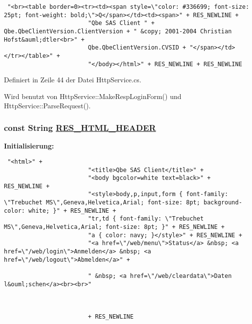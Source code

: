 \footnotesize\begin{verbatim} "<br><table border=0><tr><td><span style=\"color: #336699; font-size: 25pt; font-weight: bold;\">Q</span></td><td><span>" + RES_NEWLINE + 
                        "Qbe SAS Client " + Qbe.QbeClientVersion.ClientVersion + " &copy; 2001-2004 Christian Hofst&auml;dtler<br>" + 
                        Qbe.QbeClientVersion.CVSID + "</span></td></tr></table>" + 
                        "</body></html>" + RES_NEWLINE + RES_NEWLINE
\end{verbatim}\normalsize 


Definiert in Zeile 44 der Datei Http\-Service.cs.

Wird benutzt von Http\-Service::Make\-Resp\-Login\-Form() und Http\-Service::Parse\-Request().\hypertarget{classQbeSAS_1_1HttpService_QbeSAS_1_1HttpServicer12}{
\subsubsection[RES\_\-HTML\_\-HEADER]{\setlength{\rightskip}{0pt plus 5cm}const String \hyperlink{classQbeSAS_1_1HttpService_QbeSAS_1_1HttpServicer12}{RES\_\-HTML\_\-HEADER}}}
\label{classQbeSAS_1_1HttpService_QbeSAS_1_1HttpServicer12}


{\bf Initialisierung:}

\footnotesize\begin{verbatim} "<html>" + 
                        "<title>Qbe SAS Client</title>" + 
                        "<body bgcolor=white text=black>" + RES_NEWLINE +
                        "<style>body,p,input,form { font-family: \"Trebuchet MS\",Geneva,Helvetica,Arial; font-size: 8pt; background-color: white; }" + RES_NEWLINE +
                        "tr,td { font-family: \"Trebuchet MS\",Geneva,Helvetica,Arial; font-size: 8pt; }" + RES_NEWLINE +
                        "a { color: navy; }</style>" + RES_NEWLINE +
                        "<a href=\"/web/menu\">Status</a> &nbsp; <a href=\"/web/login\">Anmelden</a> &nbsp; <a href=\"/web/logout\">Abmelden</a>" + 

                        " &nbsp; <a href=\"/web/cleardata\">Daten l&ouml;schen</a><br><br>"



                        + RES_NEWLINE
\end{verbatim}\normalsize 


